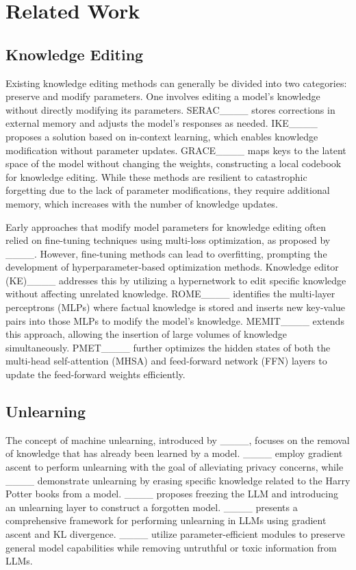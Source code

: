 \section{Related Work}
\subsection{Knowledge Editing}
Existing knowledge editing methods can generally be divided into two categories: preserve and modify parameters.
One involves editing a model's knowledge without directly modifying its parameters. SERAC____ stores corrections in external memory and adjusts the model’s responses as needed. 
IKE____ proposes a solution based on in-context learning, which enables knowledge modification without parameter updates. GRACE____ maps keys to the latent space of the model without changing the weights, constructing a local codebook for knowledge editing. While these methods are resilient to catastrophic forgetting due to the lack of parameter modifications, they require additional memory, which increases with the number of knowledge updates.

Early approaches that modify model parameters for knowledge editing often relied on fine-tuning techniques using multi-loss optimization, as proposed by ____. However, fine-tuning methods can lead to overfitting, prompting the development of hyperparameter-based optimization methods. Knowledge editor (KE)____ addresses this by utilizing a hypernetwork to edit specific knowledge without affecting unrelated knowledge. ROME____ identifies the multi-layer perceptrons (MLPs) where factual knowledge is stored and inserts new key-value pairs into those MLPs to modify the model’s knowledge. MEMIT____ extends this approach, allowing the insertion of large volumes of knowledge simultaneously. PMET____ further optimizes the hidden states of both the multi-head self-attention (MHSA) and feed-forward network (FFN) layers to update the feed-forward weights efficiently.

\subsection{Unlearning}
The concept of machine unlearning, introduced by ____, focuses on the removal of knowledge that has already been learned by a model. 
____ employ gradient ascent to perform unlearning with the goal of alleviating privacy concerns, while ____ demonstrate unlearning by erasing specific knowledge related to the Harry Potter books from a model. ____ proposes freezing the LLM and introducing an unlearning layer to construct a forgotten model. ____ presents a comprehensive framework for performing unlearning in LLMs using gradient ascent and KL divergence. ____ utilize parameter-efficient modules to preserve general model capabilities while removing untruthful or toxic information from LLMs.

